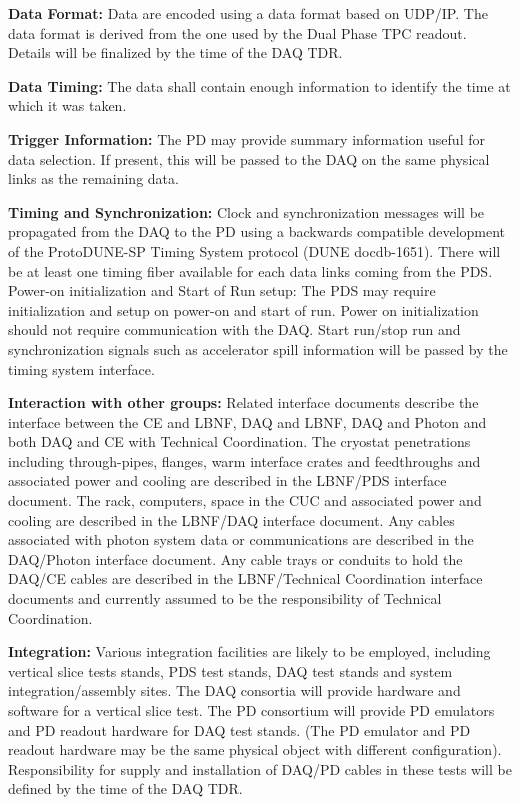 \textbf{Data Format:} Data are encoded using a data format based on UDP/IP. The data format is derived from the one used by the Dual Phase TPC readout. Details will be finalized by the time of the DAQ TDR.

\textbf{Data Timing:} The data shall contain enough information to identify the time  at which it was taken.

\textbf{Trigger Information:} The PD may provide summary information useful for data selection. If present, this will be passed to the DAQ on the same physical links as the remaining data.

\textbf{Timing and Synchronization: }Clock and synchronization messages will be propagated from the DAQ to the PD using a backwards compatible development of the ProtoDUNE-SP Timing System protocol (DUNE docdb-1651). There will be at least one timing fiber available for each data links coming from the PDS. Power-on initialization and Start of Run setup:  The PDS may require initialization and setup on power-on and start of run. Power on initialization should not require communication with the DAQ. Start run/stop run and synchronization signals such as accelerator spill information will be passed by the timing system interface.

\textbf{Interaction with other groups: }Related interface documents describe the interface between the CE and LBNF, DAQ and LBNF, DAQ and Photon and both DAQ and CE with Technical Coordination. The cryostat penetrations including through-pipes, flanges, warm interface crates and feedthroughs and associated power and cooling are described in the LBNF/PDS interface document.  The rack, computers, space in the CUC and associated power and cooling are described in the LBNF/DAQ interface document. Any cables associated with photon system data or communications are described in the DAQ/Photon interface document. Any cable trays or conduits to hold the DAQ/CE cables are described in the LBNF/Technical Coordination interface documents and currently assumed to be the responsibility of Technical Coordination.

\textbf{Integration:} Various integration facilities are likely to be employed, including vertical slice tests stands, PDS test stands, DAQ test stands and system integration/assembly sites. The DAQ consortia will provide hardware and software for a vertical slice test. The PD consortium will provide PD emulators and PD readout hardware for DAQ test stands. (The PD emulator and PD readout hardware may be the same physical object with different configuration). Responsibility for supply and installation of DAQ/PD cables in these tests will be defined by the time of the DAQ TDR.



